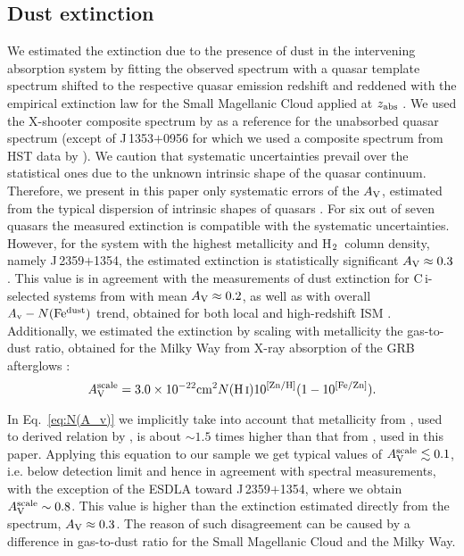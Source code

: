 \documentclass[fleqn,usenatbib,useAMS]{mnras}
\newcommand{\HH}{\mbox{H$\rm _2$}}
\newcommand{\HI}{H\,{\sc i}}
\newcommand{\CI}{C\,{\sc i}}
\begin{document}
\subsection{Dust extinction \label{subsec:extinction_measurement}}

We estimated the extinction due to the presence of dust in the intervening absorption system by fitting the observed spectrum with a quasar template spectrum shifted to the respective quasar emission redshift and reddened with the empirical extinction law for the Small Magellanic Cloud \citep{Gordon2003} applied at $z_{\rm abs}$ \citep[see e.g.][]{Srianand2008b}. We used the X-shooter composite spectrum by \citet{Selsing2016} as a reference for the unabsorbed quasar spectrum (except of J\,1353$+$0956 for which we used a composite spectrum from HST data by \citealt{Telfer2002}). We caution that systematic uncertainties prevail over the statistical ones due to the unknown intrinsic shape of the quasar continuum. Therefore, we present in this paper only systematic errors of the $A_{\rm V}$, estimated from the typical dispersion of intrinsic shapes of quasars \cite[see e.g.][]{Noterdaeme2017,Ranjan2020}. 
For six out of seven quasars the measured extinction is compatible with the systematic uncertainties. However, for the system with the highest metallicity and \HH\ column density, namely J\,2359$+$1354, the estimated extinction is statistically significant $A_{\rm V}\approx0.3$. This value is in agreement with the measurements of dust extinction for \CI-selected systems from \citep{Zou2018} with mean $A_{\rm V}\approx0.2$, as well as with overall $A_{\rm v}-N({\rm Fe^{dust}})$ trend, obtained for both local and high-redshift ISM \citep[e.g.][]{Zou2018}.
Additionally, we estimated the extinction by scaling with metallicity the gas-to-dust ratio, obtained for the Milky Way from X-ray absorption of the GRB afterglows \citep{Watson2011}: 
\begin{equation}\label{eq:N(A_v)}
    A^{\rm scale}_{\rm V} = 3.0\times 10^{-22} \text{cm}^{2} N(\rm \text{\HI}) 10^{[\rm Zn/H]}(1-10^{\rm[Fe/Zn]}).
\end{equation}

In Eq.~\ref{eq:N(A_v)} we implicitly take into account that metallicity from \citet{Anders1989}, used to derived relation by \citealt{Watson2011}, is about $\sim1.5$ times higher than that from \citet{Asplund2009}, used in this paper. Applying this equation to our sample we get typical values of $A^{\rm scale}_{\rm V} \lesssim 0.1$, i.e. below detection limit and hence in agreement with spectral measurements, with the exception of the ESDLA toward J\,2359$+$1354, where we obtain $A^{\rm scale}_{\rm V} \sim 0.8$. This value is higher than the extinction estimated directly from the spectrum, $A_{\rm V} \approx 0.3$. The reason of such disagreement can be caused by a difference in gas-to-dust ratio for the Small Magellanic Cloud and the Milky Way. 
\end{document}
